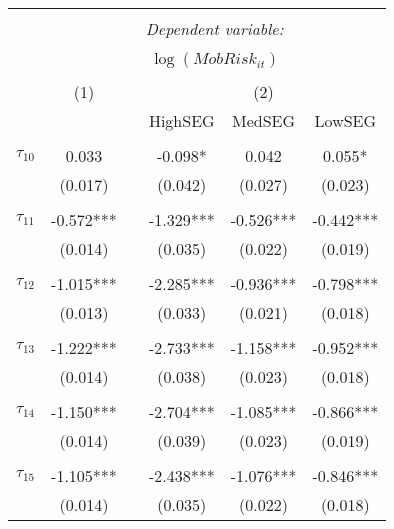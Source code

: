 \begin{tabular}{@{\extracolsep{-0pt}}lccccc} 
\\[-1.8ex]\hline 
\hline \\[-1.8ex] 
 & \multicolumn{5}{c}{\textit{Dependent variable:}} \\ 
\cline{2-6} 
\\[-1.8ex] & \multicolumn{5}{c}{$\log(MobRisk_{it})$}\\ 
\\[-1.8ex] & (1) && \multicolumn{3}{c}{(2)} \\ 
\cline{2-2}\cline{4-6}
        &&& HighSEG & MedSEG & LowSEG  \\
 \\[-1.8ex] 
$\tau_{10}$     &   0.033   &&  -0.098*  &   0.042   &  0.055*   \\
                &  (0.017)  &&  (0.042)  &  (0.027)  &  (0.023)  \\
                &           &&           &           &           \\[-2.1ex]
$\tau_{11}$     & -0.572*** && -1.329*** & -0.526*** & -0.442*** \\
                &  (0.014)  &&  (0.035)  &  (0.022)  &  (0.019)  \\
                &           &&           &           &           \\[-2.1ex]
$\tau_{12}$     & -1.015*** && -2.285*** & -0.936*** & -0.798*** \\
                &  (0.013)  &&  (0.033)  &  (0.021)  &  (0.018)  \\
                &           &&           &           &           \\[-2.1ex]
$\tau_{13}$     & -1.222*** && -2.733*** & -1.158*** & -0.952*** \\
                &  (0.014)  &&  (0.038)  &  (0.023)  &  (0.018)  \\
                &           &&           &           &           \\[-2.1ex]
$\tau_{14}$     & -1.150*** && -2.704*** & -1.085*** & -0.866*** \\
                &  (0.014)  &&  (0.039)  &  (0.023)  &  (0.019)  \\
                &           &&           &           &           \\[-2.1ex]
$\tau_{15}$     & -1.105*** && -2.438*** & -1.076*** & -0.846*** \\
                &  (0.014)  &&  (0.035)  &  (0.022)  &  (0.018)  \\

\end{tabular}
